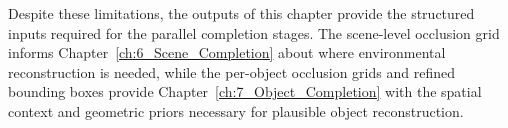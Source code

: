 Despite these limitations, the outputs of this chapter provide the structured inputs required for the parallel completion stages. The scene-level occlusion grid informs Chapter~\ref{ch:6_Scene_Completion} about where environmental reconstruction is needed, while the per-object occlusion grids and refined bounding boxes provide Chapter~\ref{ch:7_Object_Completion} with the spatial context and geometric priors necessary for plausible object reconstruction.


\cleardoublepage